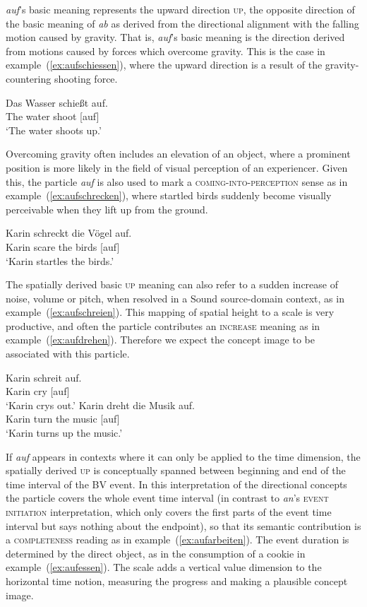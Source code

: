 \documentclass[output=paper]{langsci/langscibook}
\begin{document}
\textit{auf}'s basic meaning represents the upward direction
\textsc{up}, the opposite direction of the basic meaning of
\textit{ab} as derived from the directional alignment with the falling
motion caused by gravity. That is, \textit{auf}'s basic meaning is the
direction derived from motions caused by forces which overcome
gravity. This is the case in example~(\ref{ex:aufschiessen}), where
the upward direction is a result of the gravity-countering shooting
force.

\ea\label{ex:aufschiessen}
\gll Das Wasser schießt auf.\\
The water shoot [auf]\\
\glt `The water shoots up.'
\z

Overcoming gravity often includes an elevation of an object, where a
prominent position is more likely in the field of visual perception of
an experiencer. Given this, the particle \textit{auf} is also used to
mark a \textsc{coming-into-perception} sense as in
example~(\ref{ex:aufschrecken}), where startled birds suddenly become
visually perceivable when they lift up from the ground.

\ea\label{ex:aufschrecken}
\gll Karin schreckt die Vögel auf.\\
Karin scare the birds [auf]\\
\glt `Karin startles the birds.'
\z

The spatially derived basic \textsc{up} meaning can also refer to a
sudden increase of noise, volume or pitch, when resolved in a
Sound source-domain context, as in
example~(\ref{ex:aufschreien}). This mapping of spatial height to a
scale is very productive, and often the particle contributes an
\textsc{increase} meaning as in
example~(\ref{ex:aufdrehen}). Therefore we expect the concept image
 to be associated with this particle.

\ea\label{ex:aufschreien}
\gll Karin schreit auf.\\
Karin cry [auf]\\
\glt `Karin crys out.'
\ex \label{ex:aufdrehen}
\gll Karin dreht die Musik auf.\\
Karin turn the music [auf]\\
\glt `Karin turns up the music.'
\z

If \textit{auf} appears in contexts where it can only be applied to
the time dimension, the spatially derived \textsc{up} is conceptually
spanned between beginning and end of the time interval of the BV
event. In this interpretation of the directional concepts the particle
covers the whole event time interval (in contrast to \textit{an}'s
\textsc{event initiation} interpretation, which only covers the first
parts of the event time interval but says nothing about the endpoint),
so that its semantic contribution is a \textsc{completeness} reading
as in example~(\ref{ex:aufarbeiten}). The event duration is determined
by the direct object, as in the consumption of a cookie in
example~(\ref{ex:aufessen}). The scale adds a vertical value dimension
to the horizontal time notion, measuring the progress and making
 a plausible concept image.
\end{document}
